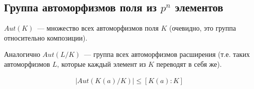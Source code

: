 \subsection{Группа автоморфизмов поля из $p^n$ элементов}
\begin{conj}
    $Aut(K)$~--- множество всех автоморфизмов поля $K$ (очевидно, это группа относительно композиции).

    Аналогично $Aut(L/K)$~--- группа всех автоморфизмов расширения (т.е. таких автоморфизмов $L$, которые каждый элемент из $K$ переводят в себя же).
\end{conj}
\begin{lemma}
    \begin{gather*}
        \left| Aut(K(a) / K) \right| \le [K(a) : K]
    \end{gather*}
\end{lemma}
